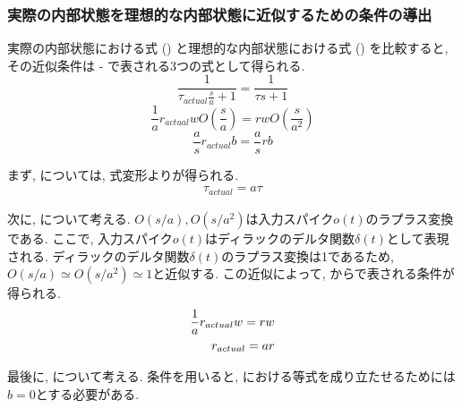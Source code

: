 \subsubsection{実際の内部状態を理想的な内部状態に近似するための条件の導出}
実際の内部状態における式 () と理想的な内部状態における式 () を比較すると, その近似条件は - で表される3つの式として得られる.
\begin{equation}
    \frac{1}{\tau_{actual} \frac{s}{a} +1} = \frac{1}{\tau s +1}  \label{eq:approximation:condition1}
\end{equation}
\begin{equation}
    \frac{1}{a} r_{actual} w O\left(\frac{s}{a}\right) = r w O\left(\frac{s}{a^2}\right) \label{eq:approximation:condition2}
\end{equation}
\begin{equation}
    \frac{a}{s} r_{actual} b = \frac{a}{s} r b \label{eq:approximation:condition3}
\end{equation}

まず, については, 式変形よりが得られる.
\begin{align}
    \tau_{actual} = a \tau \label{eq:approximation:condition1:result}
\end{align}

次に, について考える.
$O(s/a), O(s/a^2)$は入力スパイク$o(t)$のラプラス変換である.
ここで, 入力スパイク$o(t)$はディラックのデルタ関数$\delta(t)$として表現される\cite{diracdelta}.
ディラックのデルタ関数$\delta(t)$のラプラス変換は1であるため, $O(s/a) \simeq O(s/a^2) \simeq 1$と近似する.
この近似によって, からで表される条件が得られる.
\begin{align}
    \frac{1}{a} r_{actual} w = r w \notag \\
    r_{actual} = a r \label{eq:approximation:condition2:result}
\end{align}

最後に, について考える.
条件を用いると, における等式を成り立たせるためには$b=0$とする必要がある.

